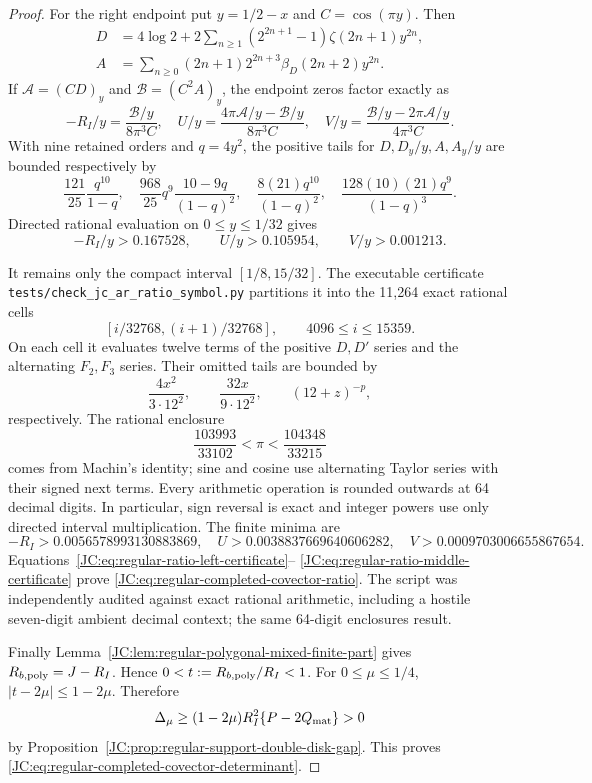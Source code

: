 \begin{proof}
For the right endpoint put $y=1/2-x$ and $C=\cos(\pi y)$.  Then
\begin{align*}
 D&=4\log2+2\sum_{n\ge1}(2^{2n+1}-1)\zeta(2n+1)y^{2n},\\
 A&=\sum_{n\ge0}(2n+1)2^{2n+3}\beta_D(2n+2)y^{2n}.
\end{align*}
If $\mathcal A=(CD)_y$ and $\mathcal B=(C^2A)_y$, the endpoint zeros
factor exactly as
\[
 -R_I/y=\frac{\mathcal B/y}{8\pi^3C},\quad
 U/y=\frac{4\pi\mathcal A/y-\mathcal B/y}{8\pi^3C},\quad
 V/y=\frac{\mathcal B/y-2\pi\mathcal A/y}{4\pi^3C}.
\]
With nine retained orders and $q=4y^2$, the positive tails for
$D,D_y/y,A,A_y/y$ are bounded respectively by
\[
 \frac{121}{25}\frac{q^{10}}{1-q},\quad
 \frac{968}{25}q^9\frac{10-9q}{(1-q)^2},\quad
 \frac{8(21)q^{10}}{(1-q)^2},\quad
 \frac{128(10)(21)q^9}{(1-q)^3}.
\]
Directed rational evaluation on $0\le y\le1/32$ gives
\begin{equation}\label{JC:eq:regular-ratio-right-certificate}
 -R_I/y>0.167528,\qquad U/y>0.105954,\qquad V/y>0.001213.
\end{equation}

It remains only the compact interval $[1/8,15/32]$.  The executable
certificate
\texttt{tests/check\_jc\_ar\_ratio\_symbol.py} partitions it into the
11,264 exact rational cells
\[
 [i/32768,(i+1)/32768],\qquad4096\le i\le15359.
\]
On each cell it evaluates twelve terms of the positive $D,D'$ series and
the alternating $F_2,F_3$ series.  Their omitted tails are bounded by
\[
 \frac{4x^2}{3\cdot12^2},\qquad
 \frac{32x}{9\cdot12^2},\qquad (12+z)^{-p},
\]
respectively.  The rational enclosure
\[
 \frac{103993}{33102}<\pi<\frac{104348}{33215}
\]
comes from Machin's identity; sine and cosine use alternating Taylor
series with their signed next terms.  Every arithmetic operation is
rounded outwards at 64 decimal digits.  In particular, sign reversal is
exact and integer powers use only directed interval multiplication.  The
finite minima are
\begin{equation}\label{JC:eq:regular-ratio-middle-certificate}
 -R_I>0.0056578993130883869,\quad
 U>0.0038837669640606282,\quad
 V>0.0009703006655867654.
\end{equation}
Equations~\eqref{JC:eq:regular-ratio-left-certificate}--
\eqref{JC:eq:regular-ratio-middle-certificate} prove
\eqref{JC:eq:regular-completed-covector-ratio}.  The script was independently
audited against exact rational arithmetic, including a hostile seven-digit
ambient decimal context; the same 64-digit enclosures result.

Finally Lemma~\ref{JC:lem:regular-polygonal-mixed-finite-part} gives
$R_{b,{\rm poly}}=J-R_I$.  Hence
$0<t:=R_{b,{\rm poly}}/R_I<1$.  For $0\le\mu\le1/4$,
$|t-2\mu|\le1-2\mu$.  Therefore
\[
 \Delta_\mu\ge(1-2\mu)R_I^2\{P-2Q_{\rm mat}\}>0
\]
by Proposition~\ref{JC:prop:regular-support-double-disk-gap}.  This proves
\eqref{JC:eq:regular-completed-covector-determinant}.
\end{proof}

